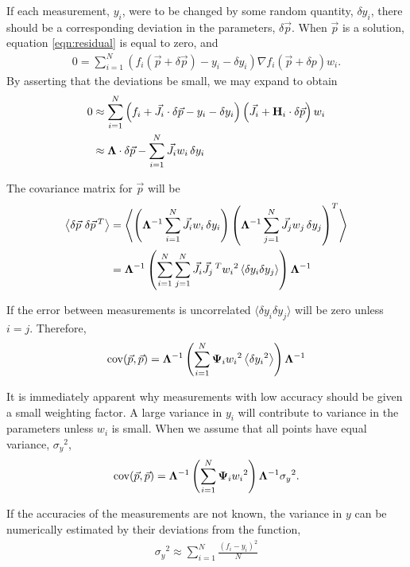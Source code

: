 \documentclass{article}
\def\p{\vec{p}}
\def\J{\vec{J}}
\def\H{{\bf H}}
\def\LAM{{\bf \Lambda}}
\def\PSI{{\bf \Psi}}
\begin{document}
If each measurement, $y_i$, were to be changed by some random quantity, $\delta y_i$, there should be a corresponding deviation in the parameters, $\delta \p$.  When $\p$ is a solution, equation \ref{eqn:residual} is equal to zero, and
\begin{align}
0 = \sum_{i=1}^N \left( f_i(\p + \delta \p) - y_i - \delta y_i \right) \nabla f_i(\p + \delta p) w_i.
\end{align}
By asserting that the deviations be small, we may expand to obtain
\begin{align}
0 &\approx \sum_{i=1}^N \left( f_i + \J_i \cdot \delta\p - y_i - \delta y_i \right) \left( \J_i + \H_i\cdot\delta\p \right)w_i \nonumber\\
&\approx \LAM \cdot \delta \p - \sum_{i=1}^N \J_i w_i\, \delta y_i\nonumber
\end{align}

The covariance matrix for $\p$ will be
\begin{align}
\left\langle \delta\p\ \delta\p\,{^T} \right\rangle &= \left\langle \left(\LAM^{-1} \sum_{i=1}^N \J_i w_i\, \delta y_i \right) \left(\LAM^{-1} \sum_{j=1}^N \J_j w_j\, \delta y_j\right)^T \right\rangle\nonumber\\
&= \LAM^{-1} \left( \sum_{i=1}^N \sum_{j=1}^N \J_i \J_j\,{^T} w_i{^2} \left\langle \delta y_i \delta y_j \right\rangle \right) \LAM^{-1} \nonumber
\end{align}

If the error between measurements is uncorrelated $\langle \delta y_i \delta y_j \rangle$ will be zero unless $i=j$.  Therefore,
\begin{align}
\mathrm{cov}(\p,\p) = \LAM^{-1} \left( \sum_{i=1}^N \PSI_i w_i{^2} \left\langle \delta y_i{^2} \right\rangle \right) \LAM^{-1}\label{eqn:covar}
\end{align}

It is immediately apparent why measurements with low accuracy should be given a small weighting factor.  A large variance in $y_i$ will contribute to variance in the parameters unless $w_i$ is small.  When we assume that all points have equal variance, $\sigma_y{^2}$,
\begin{align}
\mathrm{cov}(\p,\p) =  \LAM^{-1} \left( \sum_{i=1}^N \PSI_i w_i{^2} \right) \LAM^{-1} \sigma_y{^2}.\label{eqn:covar2}
\end{align}

If the accuracies of the measurements are not known, the variance in $y$ can be numerically estimated by their deviations from the function,
\begin{align}
\sigma_y{^2} \approx \sum_{i=1}^N \frac{\left( f_i - y_i \right)^2}{N}
\end{align}
\end{document}
